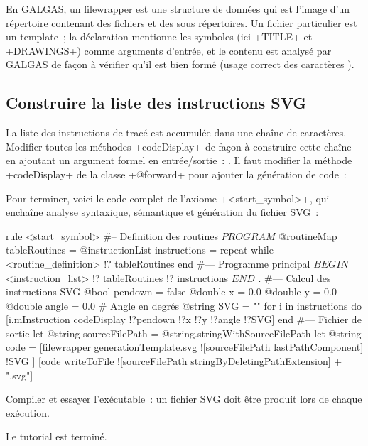 En GALGAS, un filewrapper est une structure de données qui est l'image d'un répertoire contenant des fichiers et des sous répertoires. Un fichier particulier est un template~; la déclaration mentionne les symboles (ici \ggsq+TITLE+ et \ggsq+DRAWINGS+) comme arguments d'entrée, et le contenu est analysé par GALGAS de façon à vérifier qu'il est bien formé (usage correct des caractères \tpp{\%}).

\subsection{Construire la liste des instructions SVG}
La liste des instructions de tracé est accumulée dans une chaîne de caractères. Modifier toutes les méthodes \ggsq+codeDisplay+ de façon à construire cette chaîne en ajoutant un argument formel en entrée/sortie~: . Il faut modifier la méthode \ggsq+codeDisplay+ de la classe \ggsq+@forward+ pour ajouter la génération de code~:


Pour terminer, voici le code complet de l’axiome \ggsq+<start_symbol>+, qui enchaîne analyse syntaxique, sémantique et génération du fichier SVG~:
\begin{galgas4}
rule <start_symbol> {
#-- Definition des routines
  $PROGRAM$
  @routineMap tableRoutines = {}
  @instructionList instructions = {}
  repeat
  while
    <routine_definition> !? tableRoutines
  end
#--- Programme principal
  $BEGIN$
  <instruction_list> !? tableRoutines !? instructions
  $END$
  $.$
#--- Calcul des instructions SVG
  @bool pendown = false
  @double x = 0.0
  @double y = 0.0
  @double angle = 0.0 # Angle en degrés
  @string SVG = ""
  for i in instructions do
    [i.mInstruction codeDisplay !?pendown !?x !?y !?angle !?SVG]
  end
#--- Fichier de sortie
  let @string sourceFilePath = @string.stringWithSourceFilePath
  let @string code = [filewrapper generationTemplate.svg
    ![sourceFilePath lastPathComponent]
    !SVG
  ]
  [code writeToFile ![sourceFilePath stringByDeletingPathExtension] + ".svg"]
}
\end{galgas4}

Compiler et essayer l'exécutable~: un fichier SVG doit être produit lors de chaque exécution.

Le tutorial est terminé.
